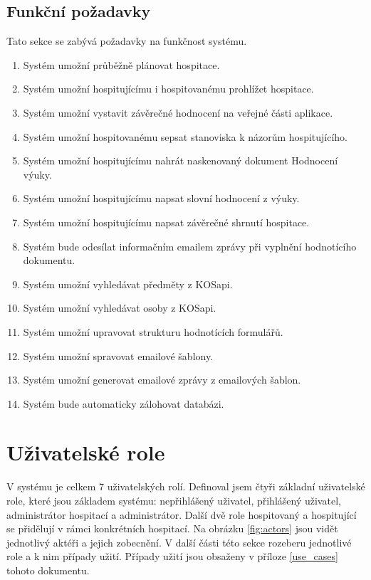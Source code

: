 \subsection{Funkční požadavky}
Tato sekce se zabývá požadavky na funkčnost systému.
\begin{enumerate}
\item Systém umožní průběžně plánovat hospitace.
\item Systém umožní hospitujícímu i hospitovanému prohlížet hospitace.
\item Systém umožní vystavit závěrečné hodnocení na veřejné části aplikace. 
\item Systém umožní hospitovanému sepsat stanoviska k názorům hospitujícího.
\item Systém umožní hospitujícímu nahrát naskenovaný dokument Hodnocení výuky.
\item Systém umožní hospitujícímu napsat slovní hodnocení z výuky.
\item Systém umožní hospitujícímu napsat závěrečné shrnutí hospitace.
\item Systém bude odesílat informačním emailem zprávy při vyplnění hodnotícího dokumentu.
\item Systém umožní vyhledávat předměty z KOSapi.
\item Systém umožní vyhledávat osoby z KOSapi.
\item Systém umožní upravovat strukturu hodnotících formulářů.
\item Systém umožní spravovat emailové šablony.
\item Systém umožní generovat emailové zprávy z emailových šablon.
\item Systém bude automaticky zálohovat databázi.
\end{enumerate}

\section{Uživatelské role}
V systému je celkem 7 uživatelských rolí. Definoval jsem čtyři základní uživatelské role, které jsou základem systému: nepřihlášený uživatel, přihlášený uživatel, administrátor hospitací a administrátor. Další dvě role hospitovaný a hospitující se přidělují v rámci konkrétních hospitací. Na obrázku \ref{fig:actors} jsou vidět jednotlivý aktéři a jejich zobecnění. V další části této sekce rozeberu jednotlivé role a k nim případy užití. Případy užití jsou obsaženy v příloze \ref{use_cases} tohoto dokumentu.

